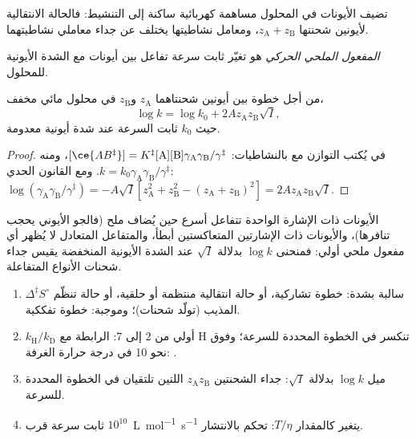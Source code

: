 تضيف الأيونات في المحلول مساهمة كهربائية ساكنة إلى التنشيط: فالحالة
الانتقالية لأيونين شحنتها $z_{\mathrm A} + z_{\mathrm B}$، ومعامل نشاطيتها
يختلف عن جداء معاملي نشاطيتهما.

\begin{definition}\label{def:b3:rate-theories:salt}
\emph{المفعول الملحي الحركي} هو تغيّر ثابت
سرعة تفاعل بين أيونات مع الشدة الأيونية للمحلول.
\end{definition}

\begin{proposition}\label{prop:b3:rate-theories:bronsted-bjerrum}
من أجل خطوة بين أيونين شحنتاهما $z_{\mathrm A}$ و$z_{\mathrm B}$ في محلول مائي مخفف،
\[
  \log k = \log k_0 + 2Az_{\mathrm A}z_{\mathrm B}\sqrt I,
\]
حيث $k_0$ ثابت السرعة عند شدة أيونية معدومة.
\end{proposition}

\begin{proof}
في  يُكتب التوازن مع 
بالنشاطيات: $[\ce{AB^{\ddagger}}] = K^{\ddagger}[\mathrm A][\mathrm B]\gamma_{\mathrm A}\gamma_{\mathrm B}/\gamma^{\ddagger}$، ومنه $k = k_0\gamma_{\mathrm A}\gamma_{\mathrm B}/\gamma^{\ddagger}$.
ومع القانون الحدي: $\log(\gamma_{\mathrm A}\gamma_{\mathrm B}/\gamma^{\ddagger}) = -A\sqrt I[z_{\mathrm A}^2 + z_{\mathrm B}^2 - (z_{\mathrm A} + z_{\mathrm B})^2] =
2Az_{\mathrm A}z_{\mathrm B}\sqrt I$.
\end{proof}

الأيونات ذات الإشارة الواحدة تتفاعل أسرع حين يُضاف ملح (فالجو الأيوني
يحجب تنافرها)، والأيونات ذات الإشارتين المتعاكستين أبطأ، والمتفاعل
المتعادل لا يُظهر أي مفعول ملحي أولي: فمنحنى $\log k$ بدلالة $\sqrt I$ عند
الشدة الأيونية المنخفضة يقيس جداء شحنات الأنواع المتفاعلة.

\begin{method}\label{met:b3:rate-theories:mechanism-evidence}
\begin{enumerate}
  \item $\Delta^{\ddagger}S^\circ$ سالبة بشدة: خطوة تشاركية، أو حالة انتقالية منتظمة أو حلقية،
        أو حالة تنظّم المذيب (تولّد شحنات)؛
        وموجبة: خطوة تفككية.
  \item $k_{\mathrm H}/k_{\mathrm D}$ أولي من 2 إلى 7: الرابطة مع H تنكسر في
        الخطوة المحددة للسرعة؛ وفوق نحو 10 في درجة حرارة الغرفة: .
  \item ميل $\log k$ بدلالة $\sqrt I$: جداء الشحنتين $z_{\mathrm A}z_{\mathrm B}$ اللتين
        تلتقيان في الخطوة المحددة للسرعة.
  \item ثابت سرعة قرب $10^{10}$~\unit{L.mol^{-1}.s^{-1}} يتغير كالمقدار $T/\eta$:
        تحكم بالانتشار.
\end{enumerate}
\end{method}

